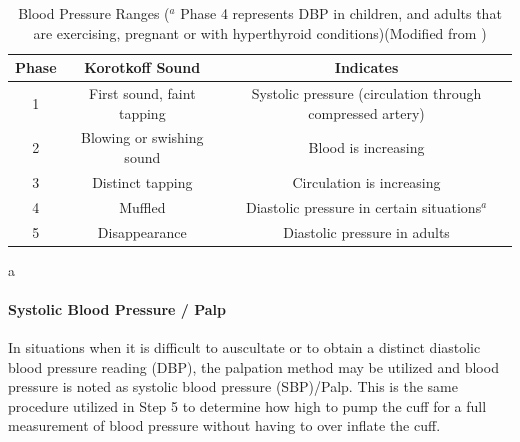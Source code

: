 \begin{table}[h!]
\centering
\begin{tabular}{||c c c ||} 
 \hline
 Phase & Korotkoff Sound & Indicates \\ [0.5ex] 
 \hline\hline
1  & First sound, faint tapping  & Systolic pressure (circulation through compressed artery)  \\ 
2  & Blowing or swishing sound  & Blood is increasing   \\
3 & Distinct tapping   & Circulation is increasing   \\
4 & Muffled  & Diastolic pressure in certain situations$^a$\\
5 & Disappearance  & Diastolic pressure in adults   \\ [1ex] 
 \hline
\end{tabular}
\caption{Blood Pressure Ranges ($^a$ \footnotesize{Phase 4 represents DBP in children, and adults that are exercising, pregnant or with hyperthyroid conditions})(Modified from \cite{bickley_bates_2012})}a
\label{Korotkoff}
\end{table}

\paragraph{Systolic Blood Pressure / Palp}

In situations when it is difficult to auscultate or to obtain a distinct diastolic blood pressure reading (DBP), the palpation method may be utilized and blood pressure is noted as systolic blood pressure (SBP)/Palp. This is the same procedure utilized in Step 5 to determine how high to pump the cuff for a full measurement of blood pressure without having to over inflate the cuff.


